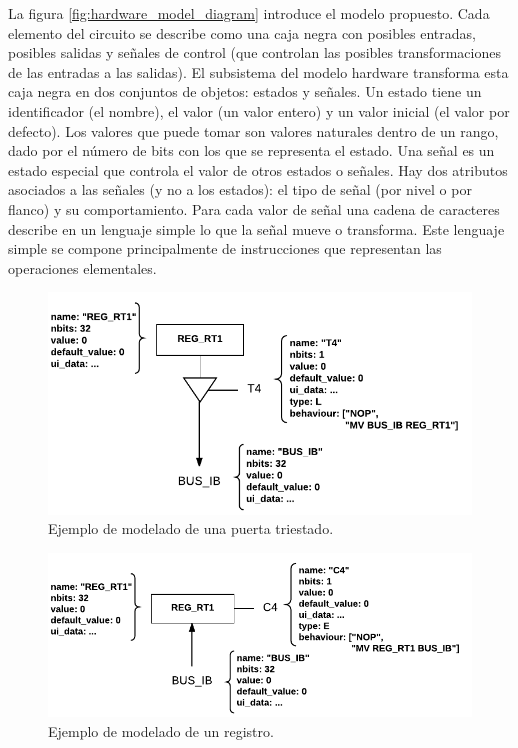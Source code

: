 La figura \ref{fig:hardware_model_diagram} introduce el modelo propuesto. Cada elemento del circuito se describe como una caja negra con posibles entradas, posibles salidas y señales de control (que controlan las posibles transformaciones de las entradas a las salidas). El subsistema del modelo \gls{hardware} transforma esta caja negra en dos conjuntos de objetos: estados y señales. Un estado tiene un identificador (el nombre), el valor (un valor entero) y un valor inicial (el valor por defecto). Los valores que puede tomar son valores naturales dentro de un rango, dado por el número de bits con los que se representa el estado. Una señal es un estado especial que controla el valor de otros estados o señales. Hay dos atributos asociados a las señales (y no a los estados): el tipo de señal (por nivel o por flanco) y su comportamiento. Para cada valor de señal una cadena de caracteres describe en un lenguaje simple lo que la señal mueve o transforma. Este lenguaje simple se compone principalmente de instrucciones que representan las operaciones elementales.

\begin{figure}[htbp]
 	\centering
 	\includegraphics[width=14cm]{figures/hardware_example_tristate}
 	\caption{Ejemplo de modelado de una puerta triestado.}
	\label{fig:hardware_tristate_example}
\end{figure}

\begin{figure}[htbp]
 	\centering
 	\includegraphics[width=14cm]{figures/hardware_example_register}
 	\caption{Ejemplo de modelado de un registro.}
	\label{fig:hardware_register_example}
\end{figure}

